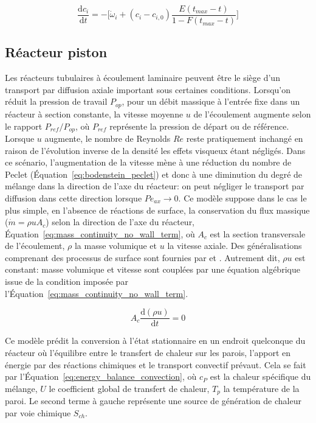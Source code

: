 \begin{equation}
\frac{\mathrm{d}c_{i}}{\mathrm{d}t}=
-\biggr[\dot{\omega}_{i}+(c_{i}-c_{i,0})\frac{E(t_{max}-t)}{1-F(t_{max}-t)}\biggr]
\label{eq:maximum_mixedness_num}
\end{equation}

\subsection{Réacteur piston}
\label{sec:reacteur-piston}

Les réacteurs tubulaires à écoulement laminaire peuvent être le siège d'un transport par diffusion axiale important sous certaines conditions. Lorsqu'on réduit la pression de travail $P_{op}$, pour un débit massique à l'entrée fixe dans un réacteur à section constante, la vitesse moyenne $u$ de l'écoulement augmente selon le rapport $P_{ref}/P_{op}$, où $P_{ref}$ représente la pression de départ \textendash{} ou de référence. Lorsque $u$ augmente, le nombre de Reynolds $Re$ reste pratiquement inchangé en raison de l'évolution inverse de la densité \textemdash{} les effets visqueux étant négligés. Dans ce scénario, l'augmentation de la vitesse mène à une réduction du nombre de Peclet (Équation~\ref{eq:bodenstein_peclet}) et donc à une diminution du degré de mélange dans la direction de l'axe du réacteur: on peut négliger le transport par diffusion dans cette direction lorsque $Pe_{ax}\rightarrow{}0$. Ce modèle suppose dans le cas le plus simple, en l'absence de réactions de surface, la conservation du flux massique ($\dot{m}=\rho uA_{c}$) selon la direction de l'axe du réacteur, Équation~\ref{eq:mass_continuity_no_wall_term}, où $A_{c}$ est la section transversale de l'écoulement, $\rho$ la masse volumique et $u$ la vitesse axiale. Des généralisations comprenant des processus de surface sont fournies par \citet{Khan2008} et \citet{Deutschmann2001}. Autrement dit, $\rho{}u$ est constant: masse volumique et vitesse sont couplées par une équation algébrique issue de la condition imposée par l'Équation~\ref{eq:mass_continuity_no_wall_term}.

\begin{equation}
A_{c}\frac{\mathrm{d}\left(\rho u\right)}{\mathrm{d}t}=0
\label{eq:mass_continuity_no_wall_term}
\end{equation}

Ce modèle prédit la conversion à l'état stationnaire en un endroit quelconque du réacteur où l'équilibre entre le transfert de chaleur sur les parois, l'apport en énergie par des réactions chimiques et le transport convectif prévaut. Cela se fait par l'Équation~\ref{eq:energy_balance_convection}, où $c_{P}$ est la chaleur spécifique du mélange, $U$ le coefficient global de transfert de chaleur, $T_{p}$ la température de la paroi. Le second terme à gauche représente une source de génération de chaleur par voie chimique $S_{ch}$. 

